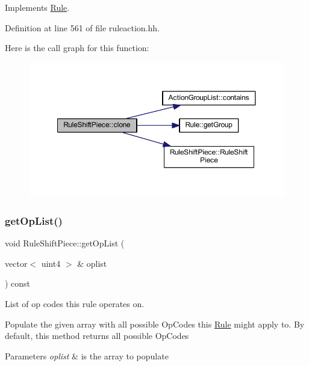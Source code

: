 Implements \mbox{\hyperlink{class_rule_a70de90a76461bfa7ea0b575ce3c11e4d}{Rule}}.



Definition at line 561 of file ruleaction.\+hh.

Here is the call graph for this function\+:
\nopagebreak
\begin{figure}[H]
\begin{center}
\leavevmode
\includegraphics[width=350pt]{class_rule_shift_piece_a891c9165fecfdfb57858dca7701889a0_cgraph}
\end{center}
\end{figure}
\mbox{\label{class_rule_shift_piece_afbb6dc1f0c7e486d8eeaf9ee867a2871}} 
\subsubsection{\texorpdfstring{getOpList()}{getOpList()}}
{\footnotesize\ttfamily void Rule\+Shift\+Piece\+::get\+Op\+List (\begin{DoxyParamCaption}\item[{vector$<$ uint4 $>$ \&}]{oplist }\end{DoxyParamCaption}) const\hspace{0.3cm}{\ttfamily [virtual]}}



List of op codes this rule operates on. 

Populate the given array with all possible Op\+Codes this \mbox{\hyperlink{class_rule}{Rule}} might apply to. By default, this method returns all possible Op\+Codes 
\begin{DoxyParams}{Parameters}
{\em oplist} & is the array to populate \\
\hline
\end{DoxyParams}


